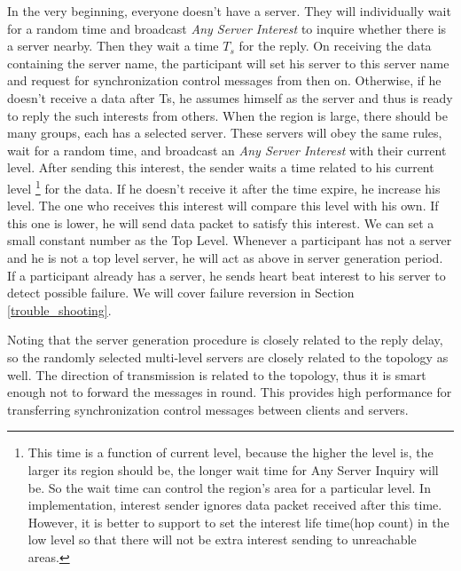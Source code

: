 \documentclass[conference]{IEEEtran}
\begin{document}
In the very beginning, everyone doesn't have a server. They will individually wait for a random time and broadcast \emph{Any Server Interest} to inquire whether there is a server nearby. Then they wait a time $T_s$ for the reply. On receiving the data containing the server name, the participant will set his server to this server name and request for synchronization control messages from then on. Otherwise, if he doesn't receive a data after Ts, he assumes himself as the server and thus is ready to reply the such interests from others. 
When the region is large, there should be many groups, each has a selected server. These servers will obey the same rules, wait for a random time, and broadcast an \emph{Any Server Interest} with their current level. After sending this interest, the sender waits a time related to his current level \footnote{This time is a function of current level, because the higher the level is, the larger its region should be, the longer wait time for Any Server Inquiry will be. So the wait time can control the region's area for a particular level. In implementation, interest sender ignores data packet received after this time. However, it is better to support to set the interest life time(hop count) in the low level so that there will not be extra interest sending to unreachable areas.} for the data. If he doesn't receive it after the time expire, he increase his level. The one who receives this interest will compare this level with his own. If this one is lower, he will send data packet to satisfy this interest. 
We can set a small constant number as the Top Level. Whenever a participant has not a server and he is not a top level server, he will act as above in server generation period. If a participant already has a server, he sends heart beat interest to his server to detect possible failure. We will cover failure reversion in Section \ref{trouble_shooting}.

Noting that the server generation procedure is closely related to the reply delay, so the randomly selected multi-level servers are closely related to the topology as well. The direction of transmission is related to the topology, thus it is smart enough not to forward the messages in round. This provides high performance for transferring synchronization control messages between clients and servers.
\end{document}
